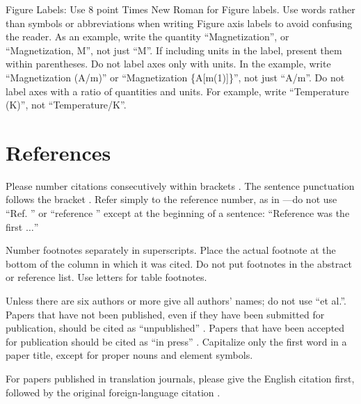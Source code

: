 \documentclass[conference]{IEEEtran}
\begin{document}

Figure Labels: Use 8 point Times New Roman for Figure labels. Use words 
rather than symbols or abbreviations when writing Figure axis labels to 
avoid confusing the reader. As an example, write the quantity 
``Magnetization'', or ``Magnetization, M'', not just ``M''. If including 
units in the label, present them within parentheses. Do not label axes only 
with units. In the example, write ``Magnetization (A/m)'' or ``Magnetization 
\{A[m(1)]\}'', not just ``A/m''. Do not label axes with a ratio of 
quantities and units. For example, write ``Temperature (K)'', not 
``Temperature/K''.

\section*{References}

Please number citations consecutively within brackets \cite{b1}. The 
sentence punctuation follows the bracket \cite{b2}. Refer simply to the reference 
number, as in \cite{b3}---do not use ``Ref. \cite{b3}'' or ``reference \cite{b3}'' except at 
the beginning of a sentence: ``Reference \cite{b3} was the first $\ldots$''

Number footnotes separately in superscripts. Place the actual footnote at 
the bottom of the column in which it was cited. Do not put footnotes in the 
abstract or reference list. Use letters for table footnotes.

Unless there are six authors or more give all authors' names; do not use 
``et al.''. Papers that have not been published, even if they have been 
submitted for publication, should be cited as ``unpublished'' \cite{b4}. Papers 
that have been accepted for publication should be cited as ``in press'' \cite{b5}. 
Capitalize only the first word in a paper title, except for proper nouns and 
element symbols.

For papers published in translation journals, please give the English 
citation first, followed by the original foreign-language citation \cite{b6}.



\end{document}

